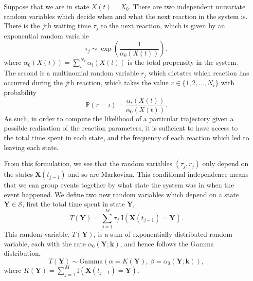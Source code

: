 \documentclass[final]{siamltex}
\begin{document}
Suppose that we are in state $X(t) = X_0$. There are two independent
univariate random variables which decide when and what the next
reaction in the system is. There is the $j$th waiting time $\tau_j$ to the
next reaction, which is given by an exponential random variable
\[\tau_j \sim \exp \left ( \frac{1}{\alpha_0(X(t))} \right ),\]
where $\alpha_0(X(t)) =\sum_{i}^{N_r} \alpha_i(X(t))$ is the total
propensity in the system. The second is a multinomial random variable $r_j$
which dictates which reaction has occurred during the $j$th reaction,
which takes the value
$r \in \{1,2,\ldots,N_r\}$ with probability
\[\mathbb{P}(r = i) = \frac{\alpha_i(X(t))}{\alpha_0(X(t))}.\]
As such, in order to compute the likelihood of a particular trajectory
given a possible realisation of the reaction parameters, it is
sufficient to have access to the total time spent in each state, and
the frequency of each reaction which led to leaving each state.

From this formulation, we see that the random variables $(\tau_j, r_j)$ only depend on the states $\mathbf{X}(t_{j-1})$ and so are Markovian. This conditional independence means that we can group events together by what state the system was in when the event happened. We define two new random variables which depend on a state $\mathbf{Y} \in \mathcal{S}$, first the total time spent in state $\mathbf{Y}$,
\[
	T(\mathbf{Y}) = \sum\limits_{j=1}^M \tau_j\; \text{I}(\mathbf{X}(t_{j-1}) = \mathbf{Y}).
\]
This random variable, $T(\mathbf{Y})$, is a sum of exponentially
distributed random variable, each with the rate $\alpha_0(\mathbf{Y};\mathbf{k})$, and hence follows the Gamma distribution,
\begin{equation}\label{eqn:chem_time_dist}
	T(\mathbf{Y}) \sim \text{Gamma}\left(\alpha=K(\mathbf{Y}),~\beta = \alpha_0(\mathbf{Y}; \mathbf{k})\right),
\end{equation}
where $K(\mathbf{Y}) = \sum\limits_{j=1}^M \text{I}(\mathbf{X}(t_{j-1}) = \mathbf{Y})$.
\end{document}
